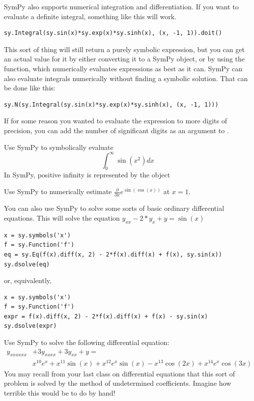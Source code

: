 SymPy also supports numerical integration and differentiation. 
If you want to evaluate a definite integral, something like this will work.
\begin{lstlisting}
sy.Integral(sy.sin(x)*sy.exp(x)*sy.sinh(x), (x, -1, 1)).doit()
\end{lstlisting}
This sort of thing will still return a purely symbolic expression, but you can get an actual value for it by either converting it to a SymPy  object, or by using the  function, which numerically evaluates expressions as best as it can.
SymPy can also evaluate integrals numerically without finding a symbolic solution. That can be done like this:
\begin{lstlisting}
sy.N(sy.Integral(sy.sin(x)*sy.exp(x)*sy.sinh(x), (x, -1, 1)))
\end{lstlisting}
If for some reason you wanted to evaluate the expression to more digits of precision, you can add the number of significant digits as an argument to .

\begin{problem}
Use SymPy to symbolically evaluate 
\begin{equation*}
\int_0^\infty \sin\left(x^2\right) dx
\end{equation*}
In SymPy, positive infinity is represented by the object 
\end{problem}

\begin{problem}
Use SymPy to numerically estimate $\frac{\partial}{\partial x}e^{\sin\left(\cos\left(x\right)\right)}$ at $x=1$.
\end{problem}

You can also use SymPy to solve some sorts of basic ordinary differential equations.
This will solve the equation $y_{xx}-2*y_x+y=\sin\left(x\right)$
\begin{lstlisting}
x = sy.symbols('x')
f = sy.Function('f')
eq = sy.Eq(f(x).diff(x, 2) - 2*f(x).diff(x) + f(x), sy.sin(x))
sy.dsolve(eq)
\end{lstlisting}
or, equivalently,
\begin{lstlisting}
x = sy.symbols('x')
f = sy.Function('f')
expr = f(x).diff(x, 2) - 2*f(x).diff(x) + f(x) - sy.sin(x)
sy.dsolve(expr)
\end{lstlisting}
\begin{problem}
Use SymPy to solve the following differential equation:
\begin{equation*}
\begin{split}
 y_{xxxxxx} & + 3y_{xxxx} + 3y_{xx} + y = \\
& x^{10}e^x + x^{11}\sin\left(x\right) + x^{12}e^x\sin\left(x\right) -x^{13}\cos\left(2x\right) + x^{14}e^x\cos\left(3x\right)
\end{split}
\end{equation*}
You may recall from your last class on differential equations that this sort of problem is solved by the method of undetermined coefficients. 
Imagine how terrible this would be to do by hand!
\end{problem}

